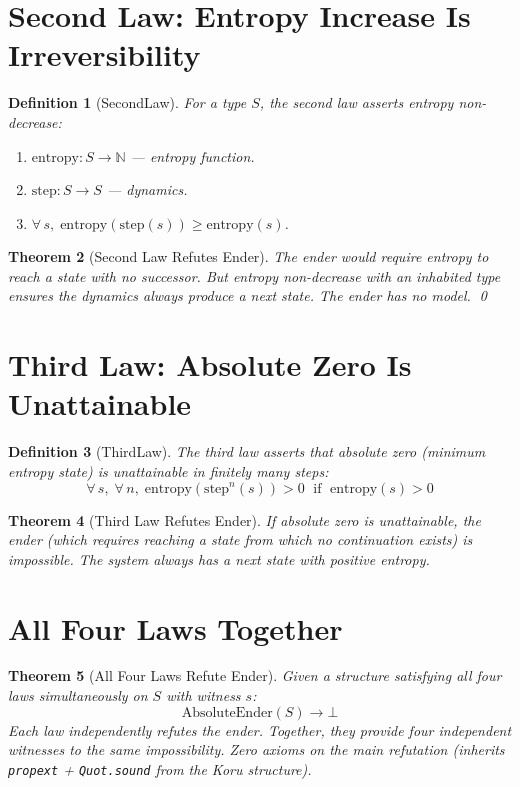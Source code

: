 \documentclass[12pt,a4paper]{article}
\newtheorem{theorem}{Theorem}[section]
\newtheorem{definition}[theorem]{Definition}
\begin{document}
\section{Second Law: Entropy Increase Is Irreversibility}

\begin{definition}[SecondLaw]
For a type $S$, the second law asserts entropy non-decrease:
\begin{enumerate}
    \item $\text{entropy} : S \to \mathbb{N}$ --- entropy function.
    \item $\text{step} : S \to S$ --- dynamics.
    \item $\forall\, s,\; \text{entropy}(\text{step}(s)) \geq \text{entropy}(s)$.
\end{enumerate}
\end{definition}

\begin{theorem}[Second Law Refutes Ender]\label{thm:second-refute}
The ender would require entropy to reach a state with no successor.
But entropy non-decrease with an inhabited type ensures the dynamics
always produce a next state. The ender has no model. \qed
\end{theorem}

\section{Third Law: Absolute Zero Is Unattainable}

\begin{definition}[ThirdLaw]
The third law asserts that absolute zero (minimum entropy state) is
unattainable in finitely many steps:
\[
\forall\, s,\; \forall\, n,\; \text{entropy}(\text{step}^n(s)) > 0
\;\text{ if }\; \text{entropy}(s) > 0
\]
\end{definition}

\begin{theorem}[Third Law Refutes Ender]\label{thm:third-refute}
If absolute zero is unattainable, the ender (which requires reaching a
state from which no continuation exists) is impossible. The system
always has a next state with positive entropy.
\end{theorem}

\section{All Four Laws Together}

\begin{theorem}[All Four Laws Refute Ender]\label{thm:all-four}
Given a structure satisfying all four laws simultaneously on $S$
with witness $s$:
\[
\text{AbsoluteEnder}(S) \to \bot
\]
Each law independently refutes the ender. Together, they provide four
independent witnesses to the same impossibility. Zero axioms on the
main refutation (inherits \texttt{propext} + \texttt{Quot.sound} from
the Koru structure).
\end{theorem}
\end{document}
